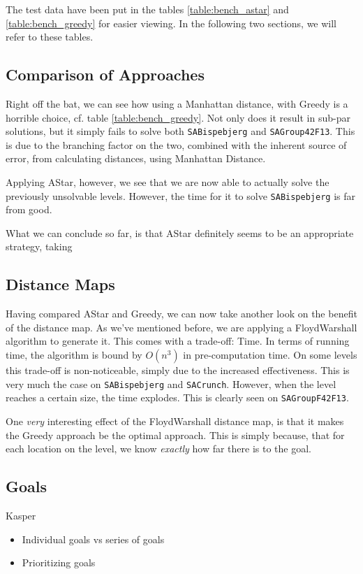 \documentclass[letterpaper]{article}
\begin{document}
		The test data have been put in the tables \ref{table:bench_astar} and \ref{table:bench_greedy} for easier viewing. In the following two sections, we will refer to these tables.




	\subsection{Comparison of Approaches}
		Right off the bat, we can see how using a Manhattan distance, with Greedy is a horrible choice, cf. table \ref{table:bench_greedy}. Not only does it result in sub-par solutions, but it simply fails to solve both \verb=SABispebjerg= and \verb=SAGroup42F13=. This is due to the branching factor on the two, combined with the inherent source of error, from calculating distances, using Manhattan Distance. 

		Applying AStar, however, we see that we are now able to actually solve the previously unsolvable levels. However, the time for it to solve \verb=SABispebjerg= is far from good.

		What we can conclude so far, is that AStar definitely seems to be an appropriate strategy, taking 


	\subsection{Distance Maps}
		Having compared AStar and Greedy, we can now take another look on the benefit of the distance map. As we've mentioned before, we are applying a FloydWarshall algorithm to generate it. This comes with a trade-off: Time. In terms of running time, the algorithm is bound by $O(n^3)$ in pre-computation time. On some levels this trade-off is non-noticeable, simply due to the increased effectiveness. This is very much the case on \verb=SABispebjerg= and \verb=SACrunch=. However, when the level reaches a certain size, the time explodes. This is clearly seen on \verb=SAGroupF42F13=.

		One \emph{very} interesting effect of the FloydWarshall distance map, is that it makes the Greedy approach be the optimal approach. This is simply because, that for each location on the level, we know \emph{exactly} how far there is to the goal.

	\subsection{Goals}
		Kasper
		\begin{itemize}
			\item{Individual goals vs series of goals}
			\item{Prioritizing goals}
		\end{itemize}
\end{document}
